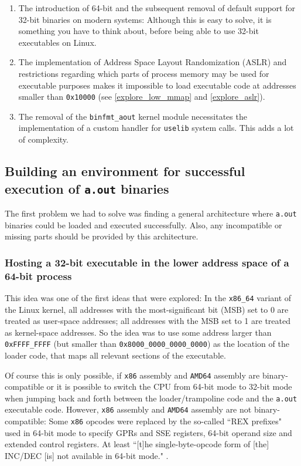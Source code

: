 \documentclass{article}
\begin{document}
\begin{enumerate}
    \item The introduction of 64-bit and the subsequent removal of default support for 32-bit binaries on modern systems: Although this is easy to solve, it is something you have to think about, before being able to use 32-bit executables on Linux.
    \item The implementation of Address Space Layout Randomization (ASLR) and restrictions regarding which parts of process memory may be used for executable purposes makes it impossible to load executable code at addresses smaller than \texttt{0x10000} (see \ref{explore_low_mmap} and \ref{explore_aslr}).
    \item The removal of the \texttt{binfmt\_aout} kernel module necessitates the implementation of a custom handler for \texttt{uselib} system calls. This adds a lot of complexity.
\end{enumerate}

\subsection{Building an environment for successful execution of \texttt{a.out} binaries}
\label{explore_environment}

The first problem we had to solve was finding a general architecture where \texttt{a.out} binaries could be loaded and executed successfully. Also, any incompatible or missing parts should be provided by this architecture.

\subsubsection{Hosting a 32-bit executable in the lower address space of a 64-bit process}
\label{explore_32_64_SxS}

This idea was one of the first ideas that were explored: In the \texttt{x86\_64} variant of the Linux kernel, all addresses with the most-significant bit (MSB) set to 0 are treated as user-space addresses; all addresses with the MSB set to 1 are treated as kernel-space addresses. So the idea was to use some address larger than \texttt{0xFFFF\_FFFF} (but smaller than \texttt{0x8000\_0000\_0000\_0000}) as the location of the loader code, that maps all relevant sections of the executable.

Of course this is only possible, if \texttt{x86} assembly and \texttt{AMD64} assembly are binary-compatible or it is possible to switch the CPU from 64-bit mode to 32-bit mode when jumping back and forth between the loader/trampoline code and the \texttt{a.out} executable code. However, \texttt{x86} assembly and \texttt{AMD64} assembly are not binary-compatible: Some \texttt{x86} opcodes were replaced by the so-called ``REX prefixes" used in 64-bit mode to specify GPRs and SSE registers, 64-bit operand size and extended control registers\cite[2.2.1]{IntelManualVol2A}.  At least ``[t]he single-byte-opcode form of [the] INC/DEC [is] not available in 64-bit mode." \cite[2.2.1.2, par. 2]{IntelManualVol2A}.
\end{document}
